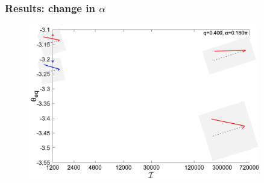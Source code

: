 \documentclass{beamer}
\begin{document}


\begin{frame}
	\frametitle{Results: change in $\alpha$}
	\begin{overlayarea}{\textwidth}{\textheight}
		\vspace{-0.3cm}  %
		\begin{figure}[htb]
			\begin{center}
				\includegraphics[width=0.9\textwidth]{plots/RESLT_q_0.400_alpha_0.180pi_plot_initial_step_refine2_new_recale_FSI_slides/initial_combine_elastic_beam_I_theta_q_0.400_alpha_0.180pi_initial_-4.80_refine2_new_0.png}
			\end{center}
		\end{figure}	
		\vspace{-0.3cm}  %
		

\end{overlayarea}
\end{frame}
\end{document}
